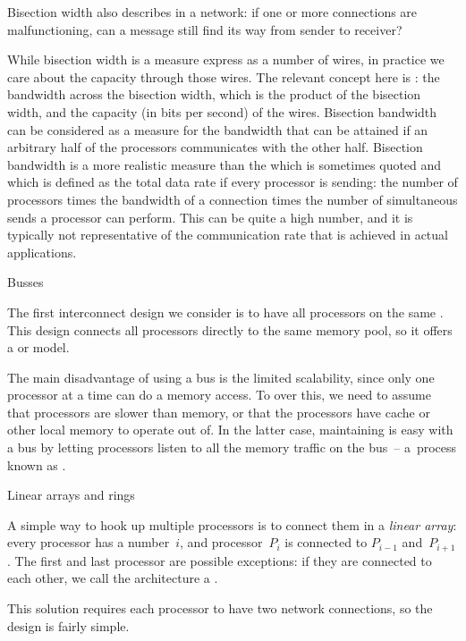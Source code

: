 Bisection width also describes  in a network: if
one or more connections are malfunctioning, can a message
still find its way from sender to receiver?

While bisection width is a measure express as a number of wires, in
practice we care about the capacity through those wires. The relevant
concept here is : the bandwidth across
the bisection width, which is the product of the bisection width, and
the capacity (in bits per second) of the wires.  
%
Bisection bandwidth
can be considered as a measure for the bandwidth that can be attained
if an arbitrary half of the processors communicates with the other
half.
Bisection bandwidth is a more realistic measure than the
 which is sometimes quoted
and which is defined
as the  total data rate if every processor is sending: the number of
processors times the bandwidth of a connection times the number of
simultaneous sends a processor can perform. This can be quite
a high number, and it is typically not representative of the
communication rate that is achieved in actual applications.

 {Busses}

The first interconnect design we consider is to have all processors
on the same . This design connects
all processors directly to the same memory pool, so it offers
a  or  model.

The main disadvantage of using a bus is the limited scalability,
since only one processor at a time can do a memory access. To over this,
we need to assume that processors are slower than memory,
or that the processors have cache or other local memory to operate out of.
In the latter case, maintaining 
is easy with a bus by letting processors listen to all the memory traffic
on the bus~-- a~process known as .

 {Linear arrays and rings}

A simple way to hook up multiple processors is to connect them in a
\emph{linear array}: every processor has a number~$i$, and
processor~$P_i$ is connected to $P_{i-1}$ and~$P_{i+1}$. The first and
last processor are possible exceptions: if they are connected to each
other, we call the architecture a .

This solution requires each processor to have two network connections,
so the design is fairly simple.


